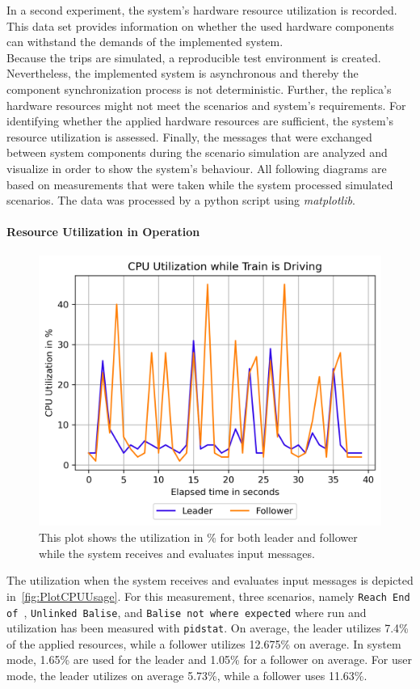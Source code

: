 In a second experiment, the system's hardware resource utilization is recorded.
This data set provides information on whether the used hardware components can withstand the demands of the implemented system.
\\

Because the trips are simulated, a reproducible test environment is created.
Nevertheless, the implemented system is asynchronous and thereby the component synchronization process is not deterministic.
Further, the replica's hardware resources might not meet the scenarios and system's requirements.
For identifying whether the applied hardware resources are sufficient, the system's resource utilization is assessed.
Finally, the messages that were exchanged between system components during the scenario simulation are analyzed and visualize in order to show the system's behaviour.
All following diagrams are based on measurements that were taken while the system processed simulated scenarios.
The data was processed by a python script using \textit{matplotlib}.

\paragraph{Resource Utilization in Operation}

\begin{figure}[!hb]
	\centering
	\includegraphics[width=0.75\linewidth]{images/plots/CPUUsage}
	\caption{This plot shows the  utilization in \% for both leader and follower while the system receives and evaluates input messages.}
	\label{fig:PlotCPUUsage}
\end{figure}

The  utilization when the system receives and evaluates input messages is depicted in~\autoref{fig:PlotCPUUsage}.
For this measurement, three scenarios, namely \texttt{Reach End of }, \texttt{Unlinked Balise}, and \texttt{Balise not where expected} where run and  utilization has been measured with \texttt{pidstat}.
On average, the leader utilizes 7.4\% of the applied  resources, while a follower utilizes 12.675\% on average.
In system mode, 1.65\% are used for the leader and 1.05\% for a follower on average.
For user mode, the leader utilizes on average 5.73\%, while a follower uses 11.63\%.

